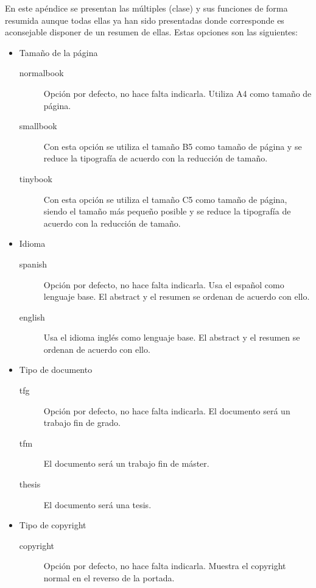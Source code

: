

En este apéndice se presentan las múltiples  (clase) y sus funciones de forma resumida aunque todas ellas ya han sido presentadas donde corresponde es aconsejable disponer de un resumen de ellas. Estas opciones son las siguientes:

\begin{itemize}
  \item Tamaño de la página
  \begin{description}
    \item [normalbook] Opción por defecto, no hace falta indicarla. Utiliza A4 como tamaño de página.
    \item [smallbook] Con esta opción se utiliza el tamaño B5 como tamaño de página y se reduce la tipografía de acuerdo con la reducción de tamaño.
    \item [tinybook]  Con esta opción se utiliza el tamaño C5 como tamaño de página, siendo el tamaño más pequeño posible y se reduce la tipografía de acuerdo con la reducción de tamaño.
  \end{description}
  \item Idioma
  \begin{description}
    \item [spanish] Opción por defecto, no hace falta indicarla. Usa el español como lenguaje base. El abstract y el resumen se ordenan de acuerdo con ello.
    \item [english] Usa el idioma inglés como lenguaje base. El abstract y el resumen se ordenan de acuerdo con ello.
  \end{description}
  \item Tipo de documento
  \begin{description}
    \item [tfg] Opción por defecto, no hace falta indicarla. El documento será un trabajo fin de grado.
    \item [tfm] El documento será un trabajo fin de máster.
    \item [thesis] El documento será una tesis.
  \end{description}
  \item Tipo de copyright
  \begin{description}
    \item [copyright] Opción por defecto, no hace falta indicarla. Muestra el copyright normal en el reverso de la portada.

\end{description}
\end{itemize}
